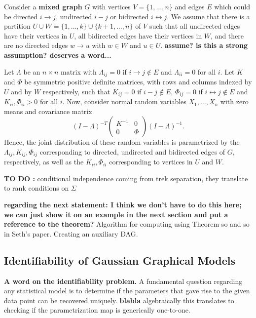 \documentclass{article}
\theoremstyle{definition}
\begin{document}
Consider a {\bf mixed graph} $G$ with vertices $V=\{1, \ldots, n\}$ and edges
$E $ which could be directed $i \rightarrow j$, undirected $i - j$ or bidirected $i \leftrightarrow j$. 
We assume that there is a partition $U \cup W = \{1, \ldots, k\} \cup \{k+1,\ldots, n\}$ of $V$ such that all undirected edges have
their vertices in $U$, all bidirected edges have their vertices in $W$, and there are no directed edges $w \rightarrow u$ with $w \in W$ and $u \in U$. 
{\bf assume? is this a strong assumption? deserves a word...}

Let $\Lambda$ be an $n{\times}n$ matrix with $\Lambda_{ij}=0$ if $i
\rightarrow j \notin E$ and $\Lambda_{ii}=0$ for all $i$. Let $K$ and $\Phi$ be symmetric positive
definite matrices, with rows and columns indexed by $U$ and by $W$ respectively, such that $K_{ij}=0$ if
$i-j \notin E$, $\Phi_{ij}=0$ if $i\leftrightarrow j \notin E$ and
$K_{ii}, \Phi_{ii} > 0$ for all $i$. Now, consider normal random
variables $X_1, \ldots, X_n$ with zero means and covariance matrix
$$
(I-\Lambda)^{-T} \begin{pmatrix} K^{-1} & 0 \\ 0 & \Phi \end{pmatrix}
(I-\Lambda)^{-1}.
$$
Hence, the joint distribution of these random variables is parametrized by the $\Lambda_{ij}, K_{ij}, \Phi_{ij}$ corresponding to directed, undirected and bidirected edges of $G$, respectively, as well as the $K_{ii}, \Phi_{ii}$ corresponding to vertices in $U$ and $W$.

{\bf TO DO :}
conditional independence coming from trek separation,
they translate to rank conditions on $\Sigma$

{\bf regarding the next statement: I think we don't have to do this here; we can just show it on an example in the next section and put a reference to the theorem?}
Algorithm for computing using Theorem so and so in Seth's
paper. Creating an auxiliary DAG.


\subsection{Identifiability of Gaussian Graphical Models}

{\bf A word on the identifiability problem.} A fundamental question regarding any statistical model is to determine if the parameters that gave rise to the given data point can be recovered uniquely. {\bf blabla} algebraically this translates to checking if the parametrization map is generically one-to-one. 
\end{document}
